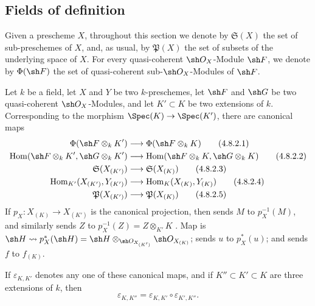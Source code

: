 \subsection{Fields of definition}
\label{subsection:IV.4.8}

\begin{env}[4.8.1]
\label{IV.4.8.1}
Given a prescheme $X$, throughout this section we denote by
$\mathfrak S(X)$ the set of sub-preschemes of $X$, and, as usual, by
$\mathfrak P(X)$ the set of subsets of the underlying space of $X$.
For every quasi-coherent $\sh O_X$-Module $\sh F$, we denote by
$\Phi(\sh F)$ the set of quasi-coherent sub-$\sh O_X$-Modules of
$\sh F$.
\end{env}

\begin{env}[4.8.2]
\label{IV.4.8.2}
Let $k$ be a field, let $X$ and $Y$ be two $k$-preschemes, let
$\sh F$ and $\sh G$ be two quasi-coherent $\sh O_X$-Modules, and let
$K'\subset K$ be two extensions of $k$.
Corresponding to the morphism $\Spec(K)\to\Spec(K')$, there are
canonical maps
\begin{align}
\Phi(\sh F\otimes_kK')
  &\longrightarrow \Phi(\sh F\otimes_kK)
\tag{4.8.2.1}
\label{IV.4.8.2.1}\\
\operatorname{Hom}(\sh F\otimes_kK',\sh G\otimes_kK')
  &\longrightarrow
   \operatorname{Hom}(\sh F\otimes_kK,\sh G\otimes_kK)
\tag{4.8.2.2}
\label{IV.4.8.2.2}\\
\mathfrak S(X_{(K')})
  &\longrightarrow \mathfrak S(X_{(K)})
\tag{4.8.2.3}
\label{IV.4.8.2.3}\\
\operatorname{Hom}_{K'}(X_{(K')},Y_{(K')})
  &\longrightarrow \operatorname{Hom}_{K}(X_{(K)},Y_{(K)})
\tag{4.8.2.4}
\label{IV.4.8.2.4}\\
\mathfrak P(X_{(K')})
  &\longrightarrow \mathfrak P(X_{(K)})
\tag{4.8.2.5}
\label{IV.4.8.2.5}
\end{align}
If $p_X:X_{(K)}\to X_{(K')}$ is the canonical projection, then
 sends $M$ to $p_X^{-1}(M)$, and similarly
 sends $Z$ to
$p_X^{-1}(Z)=Z\otimes_{K'}K$ .
Map  is $\sh H\leadsto
p_X^*(\sh H)
=
\sh H\otimes_{\sh O_{X_{(K')}}}\sh O_{X_{(K)}}$;
 sends $u$ to $p_X^*(u)$; and
 sends $f$ to $f_{(K)}$.

If $\varepsilon_{K,K'}$ denotes any one of these canonical maps, and if
$K''\subset K'\subset K$ are three extensions of $k$, then
\begin{equation}
\varepsilon_{K,K''}=\varepsilon_{K,K'}\circ\varepsilon_{K',K''}.
\tag{4.8.2.6}
\label{IV.4.8.2.6}
\end{equation}
\end{env}

